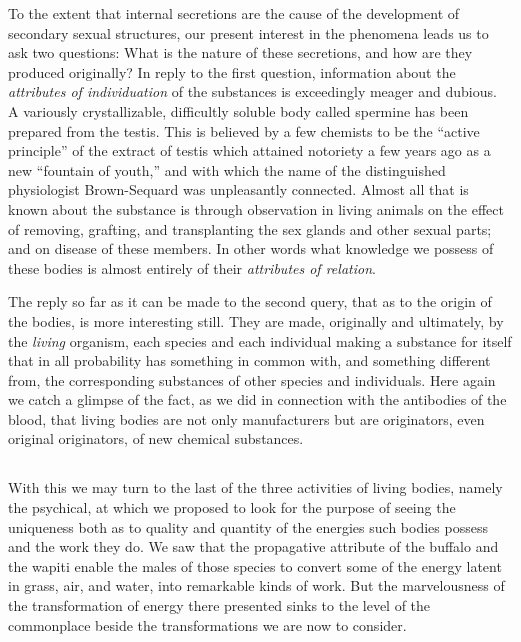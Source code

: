 \documentclass[a4paper, 11pt, oneside, polutonikogreek, english, landscape]{article}
\begin{document}
To the extent that internal secretions are the cause of the development of secondary sexual structures, our present interest in the phenomena leads us to ask two questions: What is the nature of these secretions, and how are they produced originally? In reply to the first question, information about the \emph{attributes of individuation} of the substances is exceedingly meager and dubious. A variously crystallizable, difficultly soluble body called spermine has been prepared from the testis. This is believed by a few chemists to be the ``active principle'' of the extract of testis which attained notoriety a few years ago as a new ``fountain of youth,'' and with which the name of the distinguished physiologist Brown-Sequard was unpleasantly connected. Almost all that is known about the substance is through observation in living animals on the effect of removing, grafting, and transplanting the sex glands and other sexual parts; and on disease of these members. In other words what knowledge we possess of these bodies is almost entirely of their \emph{attributes of relation}.

The reply so far as it can be made to the second query, that as to the origin of the bodies, is more interesting still. They are made, originally and ultimately, by the \emph{living} organism, each species and each individual making a substance for itself that in all probability has something in common with, and something different from, the corresponding substances of other species and individuals. Here again we catch a glimpse of the fact, as we did in connection with the antibodies of the blood, that living bodies are not only manufacturers but are originators, even original originators, of new chemical substances.

\subsection{}
\paragraph{}
With this we may turn to the last of the three activities of living bodies, namely the psychical, at which we proposed to look for the purpose of seeing the uniqueness both as to quality and quantity of the energies such bodies possess and the work they do. We saw that the propagative attribute of the buffalo and the wapiti enable the males of those species to convert some of the energy latent in grass, air, and water, into remarkable kinds of work. But the marvelousness of the transformation of energy there presented sinks to the level of the commonplace beside the transformations we are now to consider.
\end{document}
